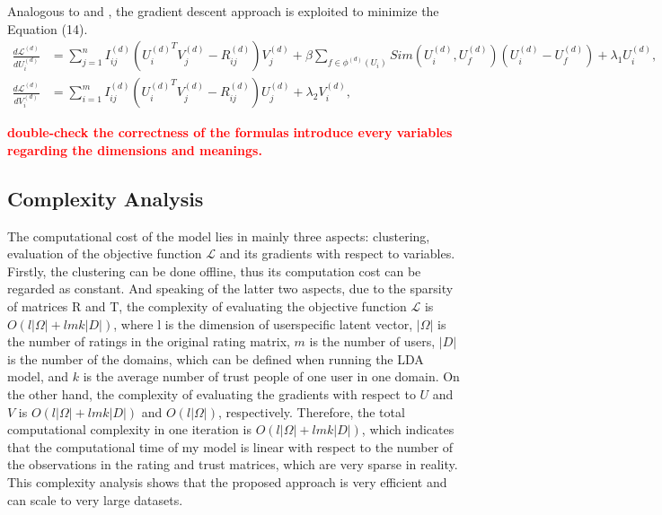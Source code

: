 Analogous to \cite{ma2011recommender} and \cite{yang2012circle}, the gradient descent approach is exploited to minimize the Equation (14). 
\begin{equation}
\begin{aligned}
\frac{d\mathcal{L}^{(d)}}{dU_i^{(d)}} &= \sum_{j=1}^{n}I^{(d)}_{ij}({U_i^{(d)}}^TV^{(d)}_j - R^{(d)}_{ij})V^{(d)}_j+\beta\sum_{f \in \phi^{(d)}(U_i)}Sim(U^{(d)}_i, U^{(d)}_f)(U^{(d)}_i - U^{(d)}_f) + \lambda_1 U_i^{(d)},
\\
\frac{d\mathcal{L}^{(d)}}{dV_i^{(d)}} &= \sum_{i=1}^{m}I^{(d)}_{ij}({U_i^{(d)}}^TV^{(d)}_j - R^{(d)}_{ij})U^{(d)}_j + \lambda_2 V_i^{(d)},
\end{aligned}
\end{equation}

\textcolor{red}{\textbf{double-check the correctness of the formulas}}
\textcolor{red}{\textbf{introduce every variables regarding the dimensions and meanings.}}

\subsection{Complexity Analysis}
The computational cost of the model lies in mainly three aspects: clustering, evaluation of the objective function $\mathcal{L}$ and its gradients with respect to variables. Firstly, the clustering can be done offline, thus its computation cost can be regarded as constant. And speaking of the latter two aspects, due to the sparsity of matrices R and T, the complexity of evaluating the objective function $\mathcal{L}$ is $O(l|\Omega| + lmk|D|)$, where l is the dimension of user\-specific latent vector, $|\Omega|$ is the number of ratings in the original rating matrix, $m$ is the number of users, $|D|$ is the number of the domains, which can be defined when running the LDA model, and $k$ is the average number of trust people of one user in one domain. On the other hand, the complexity of evaluating the gradients with respect to $U$ and $V$ is  $O(l|\Omega| + lmk|D|)$ and $O(l|\Omega|)$, respectively. Therefore, the total computational complexity in one iteration is $O(l|\Omega| + lmk|D|)$, which indicates that the computational time of my model is linear with respect to the number of the observations in the rating and trust matrices, which are very sparse in reality. This complexity analysis shows that the proposed approach is very efficient and can scale to very large datasets.




